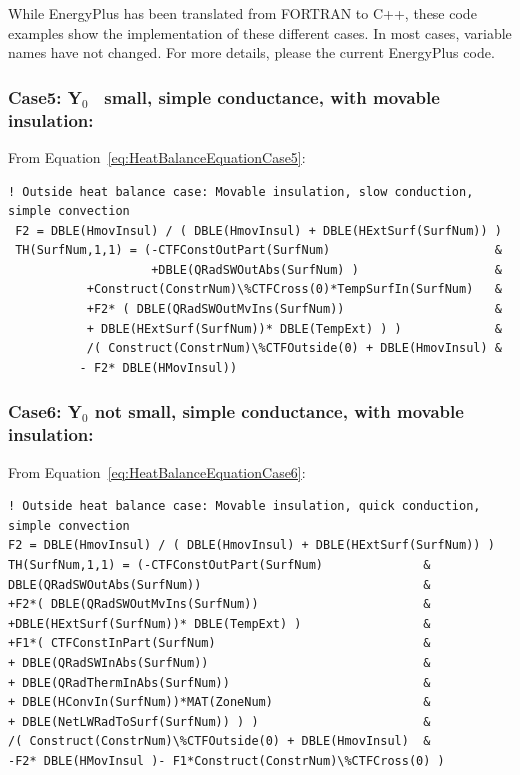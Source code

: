 While EnergyPlus has been translated from FORTRAN to C++, these code examples show the implementation of these different cases.  In most cases, variable names have not changed.  For more details, please the current EnergyPlus code.

\subsubsection{Case5: Y\(_{0}\)~ small, simple conductance, with movable insulation:}\label{case5-yux5f0-small-simple-conductance-with-movable-insulation-1}

From Equation~\ref{eq:HeatBalanceEquationCase5}:

\begin{lstlisting}
! Outside heat balance case: Movable insulation, slow conduction, simple convection
 F2 = DBLE(HmovInsul) / ( DBLE(HmovInsul) + DBLE(HExtSurf(SurfNum)) )
 TH(SurfNum,1,1) = (-CTFConstOutPart(SurfNum)                       &
                    +DBLE(QRadSWOutAbs(SurfNum) )                   &
           +Construct(ConstrNum)\%CTFCross(0)*TempSurfIn(SurfNum)   &
           +F2* ( DBLE(QRadSWOutMvIns(SurfNum))                     &
           + DBLE(HExtSurf(SurfNum))* DBLE(TempExt) ) )             &
           /( Construct(ConstrNum)\%CTFOutside(0) + DBLE(HmovInsul) &
          - F2* DBLE(HMovInsul))
\end{lstlisting}

\subsubsection{Case6: Y\(_{0}\) not small, simple conductance, with movable insulation:}\label{case6-yux5f0-not-small-simple-conductance-with-movable-insulation-1}

From Equation~\ref{eq:HeatBalanceEquationCase6}:

\begin{lstlisting}
! Outside heat balance case: Movable insulation, quick conduction, simple convection
F2 = DBLE(HmovInsul) / ( DBLE(HmovInsul) + DBLE(HExtSurf(SurfNum)) )
TH(SurfNum,1,1) = (-CTFConstOutPart(SurfNum)              &
DBLE(QRadSWOutAbs(SurfNum))                               &
+F2*( DBLE(QRadSWOutMvIns(SurfNum))                       &
+DBLE(HExtSurf(SurfNum))* DBLE(TempExt) )                 &
+F1*( CTFConstInPart(SurfNum)                             &
+ DBLE(QRadSWInAbs(SurfNum))                              &
+ DBLE(QRadThermInAbs(SurfNum))                           &
+ DBLE(HConvIn(SurfNum))*MAT(ZoneNum)                     &
+ DBLE(NetLWRadToSurf(SurfNum)) ) )                       &
/( Construct(ConstrNum)\%CTFOutside(0) + DBLE(HmovInsul)  &
-F2* DBLE(HMovInsul )- F1*Construct(ConstrNum)\%CTFCross(0) )
\end{lstlisting}

